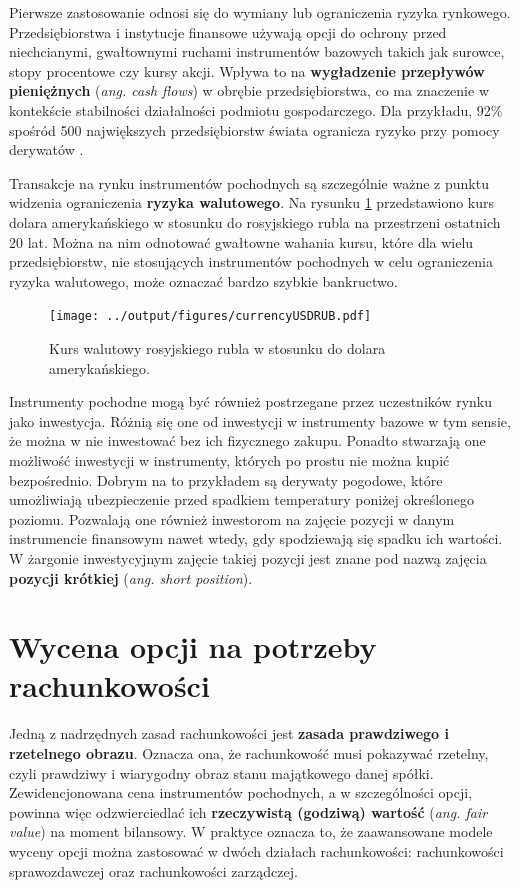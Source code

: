\documentclass{pracamgr}
\begin{document}
Pierwsze zastosowanie odnosi się do wymiany lub ograniczenia ryzyka rynkowego. Przedsiębiorstwa i 
instytucje finansowe używają opcji do 
ochrony przed niechcianymi, gwałtownymi ruchami instrumentów bazowych takich jak surowce, stopy 
procentowe czy kursy akcji. Wpływa to na 
\textbf{wygładzenie przepływów pieniężnych} (\textit{ang. cash flows}) w obrębie przedsiębiorstwa, co 
ma znaczenie w kontekście stabilności działalności 
podmiotu gospodarczego. Dla przykładu, 92\% spośród 500 największych przedsiębiorstw świata ogranicza 
ryzyko przy pomocy derywatów  \cite{GlobalDerMarket}.


Transakcje na rynku instrumentów pochodnych są szczególnie ważne z punktu widzenia 
ograniczenia \textbf{ryzyka walutowego}. Na rysunku \ref{fig:currencyRisk} przedstawiono kurs dolara 
amerykańskiego w stosunku do rosyjskiego rubla na przestrzeni ostatnich 20 lat.
Można na nim odnotować gwałtowne wahania kursu, które dla wielu przedsiębiorstw, nie stosujących 
instrumentów pochodnych w celu ograniczenia ryzyka walutowego, może oznaczać bardzo szybkie 
bankructwo. 
\begin{figure}
  \centering  
  \texttt{[image: ../output/figures/currencyUSDRUB.pdf]}
  \caption{Kurs walutowy rosyjskiego rubla w stosunku do dolara amerykańskiego.}\label{fig:currencyRisk}
\end{figure} 
 
Instrumenty pochodne mogą być również postrzegane przez uczestników rynku jako inwestycja. 
Różnią się one od inwestycji w instrumenty bazowe w tym sensie, że można w nie inwestować bez ich 
fizycznego zakupu.
Ponadto stwarzają one możliwość inwestycji w instrumenty, których po prostu nie można kupić 
bezpośrednio. Dobrym na to przykładem są derywaty pogodowe, które umożliwiają ubezpieczenie przed 
spadkiem temperatury poniżej określonego poziomu.
Pozwalają one również inwestorom na zajęcie pozycji w danym instrumencie finansowym nawet wtedy, gdy 
spodziewają się spadku ich wartości. W żargonie inwestycyjnym zajęcie takiej pozycji jest znane pod 
nazwą zajęcia \textbf{pozycji krótkiej} (\textit{ang. short position}).


\section{Wycena opcji na potrzeby rachunkowości}
\label{sec:aspekty_finansowe}

Jedną z nadrzędnych zasad rachunkowości jest \textbf{zasada prawdziwego i rzetelnego obrazu}. Oznacza 
ona, że rachunkowość musi pokazywać rzetelny, czyli prawdziwy i wiarygodny
obraz stanu majątkowego danej spółki. Zewidencjonowana cena instrumentów pochodnych, a w 
szczególności opcji, powinna więc odzwierciedlać ich \textbf{rzeczywistą 
(godziwą) wartość} (\textit{ang. fair value}) na moment bilansowy. W praktyce oznacza to, że 
zaawansowane modele wyceny opcji można zastosować w dwóch działach rachunkowości: rachunkowości 
sprawozdawczej oraz rachunkowości zarządczej.
\end{document}
